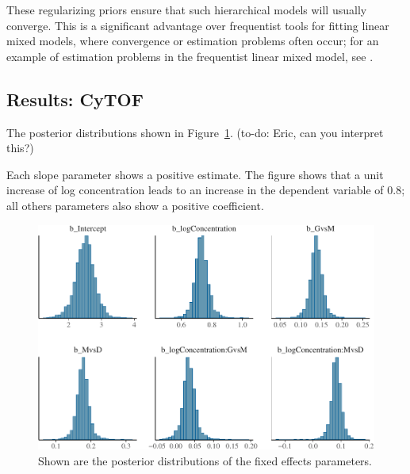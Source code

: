 \documentclass[12pt]{article}
\begin{document}
These regularizing priors ensure that such hierarchical models will usually converge. This is a significant advantage over frequentist tools for fitting linear mixed models, where convergence or estimation problems often occur; for an example of estimation problems in the frequentist linear mixed model, see \cite{VasishthBeckmanetal}. 

\subsection*{Results: CyTOF}

The posterior distributions shown in Figure~\ref{fig:cytof}.  (to-do: Eric, can you interpret this?)

Each slope parameter shows a positive estimate. The figure shows that a unit increase of log concentration leads to an increase in the dependent variable of 0.8; all others parameters also show a positive coefficient. 

\begin{figure}[!htbp]
\includegraphics{cytof_brm_log-1}
\caption{Shown are the posterior distributions of the fixed effects parameters.}\label{fig:cytof}
\end{figure}



\end{document}
